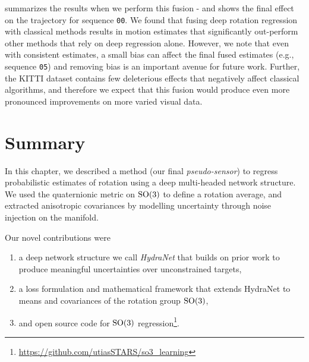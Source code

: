  summarizes the results when we perform this fusion - and  shows the final effect on the trajectory for sequence \texttt{00}. We found that fusing deep rotation regression with classical methods results in motion estimates that significantly out-perform other methods that rely on deep regression alone. However, we note that even with consistent estimates, a small bias can affect the final fused estimates (e.g., sequence \texttt{05}) and removing bias is an important avenue for future work. Further, the KITTI dataset contains few deleterious effects that negatively affect classical algorithms, and therefore we expect that this fusion would produce even more pronounced improvements on more varied visual data.

\section{Summary}
In this chapter, we described a method (our final \textit{pseudo-sensor}) to regress probabilistic estimates of rotation using a deep multi-headed network structure. We used the quaternionic metric on $\mathrm{SO}(3)$ to define a rotation average, and extracted anisotropic covariances by modelling uncertainty through noise injection on the manifold. 

Our novel contributions were
\begin{enumerate}
\item a deep network structure we call \textit{HydraNet} that builds on prior work \citep{Lakshminarayanan2017,Osband2016} to produce meaningful uncertainties over unconstrained targets,
\item a loss formulation and mathematical framework that extends HydraNet to means and covariances of the rotation group $\mathrm{SO}(3)$,
\item and open source code for $\mathrm{SO}(3)$ regression\footnote{\url{https://github.com/utiasSTARS/so3_learning}}.
\end{enumerate}

